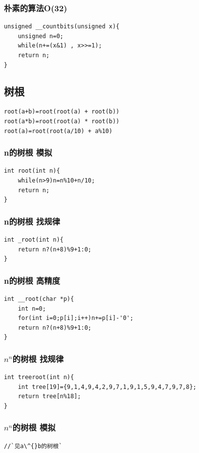\documentclass[a4paper]{article}
\begin{document}
\begin{CJK*}{UTF8}{gbsn}
\begin{multicols}{3}
\begin{flushleft}
\subsubsection{朴素的算法O(32)}
\begin{lstlisting}
unsigned __countbits(unsigned x){
	unsigned n=0;
	while(n+=(x&1) , x>>=1);
	return n;
}
\end{lstlisting}

\subsection{树根}
\begin{lstlisting}
root(a+b)=root(root(a) + root(b)) 
root(a*b)=root(root(a) * root(b)) 
root(a)=root(root(a/10) + a%10)
\end{lstlisting}

\subsubsection{n的树根 模拟}
\begin{lstlisting}
int root(int n){
	while(n>9)n=n%10+n/10;
	return n;
}
\end{lstlisting}

\subsubsection{n的树根 找规律}
\begin{lstlisting}
int _root(int n){
	return n?(n+8)%9+1:0;
}
\end{lstlisting}

\subsubsection{n的树根 高精度}
\begin{lstlisting}
int __root(char *p){
	int n=0;
	for(int i=0;p[i];i++)n+=p[i]-'0';
	return n?(n+8)%9+1:0;
} 
\end{lstlisting}

\subsubsection{$n^n$的树根 找规律}
\begin{lstlisting}
int treeroot(int n){
	int tree[19]={9,1,4,9,4,2,9,7,1,9,1,5,9,4,7,9,7,8};
	return tree[n%18];
} 
\end{lstlisting}

\subsubsection{$n^n$的树根 模拟}
\begin{lstlisting}
//`见a\^{}b的树根`
\end{lstlisting}


\end{flushleft}
\end{multicols}
\end{CJK*}
\end{document}
